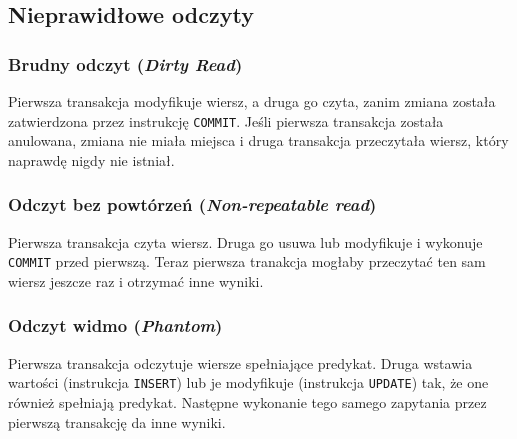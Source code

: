 \documentclass[a4paper]{article}
\begin{document}
\subsection{Nieprawidłowe odczyty}
\subsubsection{Brudny odczyt (\emph{Dirty Read})}
Pierwsza transakcja modyfikuje wiersz, a druga go czyta, zanim zmiana została zatwierdzona przez instrukcję \texttt{COMMIT}. Jeśli pierwsza transakcja została anulowana, zmiana nie miała miejsca i druga transakcja przeczytała wiersz, który naprawdę nigdy nie istniał.
\subsubsection{Odczyt bez powtórzeń (\emph{Non-repeatable read})}
Pierwsza transakcja czyta wiersz. Druga go usuwa lub modyfikuje i wykonuje \texttt{COMMIT} przed pierwszą. Teraz pierwsza tranakcja mogłaby przeczytać ten sam wiersz jeszcze raz i otrzymać inne wyniki.
\subsubsection{Odczyt widmo (\emph{Phantom})}
Pierwsza transakcja odczytuje wiersze spełniające predykat. Druga wstawia wartości (instrukcja \texttt{INSERT}) lub je modyfikuje (instrukcja \texttt{UPDATE}) tak, że one również spełniają predykat. Następne wykonanie tego samego zapytania przez pierwszą transakcję da inne wyniki.
\begin{table}
    \centering
    \caption{Poziomy izolacji i dozwolone odczyty}
    \label{poziomy-izolacji}
    \end{table}
\end{document}
